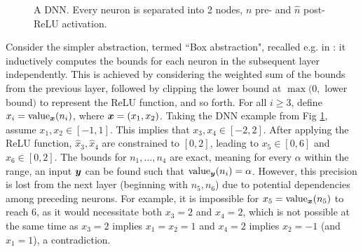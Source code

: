 \begin{figure}[t!]
	\caption{A DNN. Every neuron is separated into 2 nodes, 
	$n$ pre- and $\hat{n}$ post-ReLU activation.} 
	\label{fig1}
\end{figure}




Consider the simpler abstraction, termed ``Box abstraction", recalled e.g. in \cite{deeppoly}: it inductively computes the bounds for each neuron in the subsequent layer independently. This is achieved by considering the weighted sum of the bounds from the previous layer, followed by clipping the lower bound at $\max(0,$ lower bound$)$ to represent the ReLU function, and so forth. 
For all $i \geq 3$, define $x_i={\textrm{value}}_{{\bm{x}}}(n_i)$, where ${\bm{x}}=(x_1,x_2)$.
Taking the DNN example from Fig \ref{fig1}, assume $x_1,x_2 \in [-1,1]$. This implies that $x_3,x_4 \in [-2,2]$. After applying the ReLU function, $\hat{x}_3,\hat{x}_4$ are constrained to $[0,2]$, leading to $x_5 \in [0,6]$ and $x_6 \in [0,2]$. 
The bounds for $n_1, \ldots, n_4$ are exact, meaning for every $\alpha$ within the range, an input ${\bm{y}}$ can be found such that ${\textrm{value}}_{{\bm{y}}}(n_i)=\alpha$. However, this precision is lost from the next layer (beginning with $n_5, n_6$) due to potential dependencies among preceding neurons. For example, it is impossible for $x_5={\textrm{value}}_{{\bm{x}}}(n_5)$ to reach $6$, as it would necessitate both $x_3=2$ and $x_4=2$, which is not possible at the same time as 
$x_3=2$ implies $x_1=x_2=1$ and $x_4=2$ implies $x_2=-1$ (and $x_1=1$), a contradiction.

